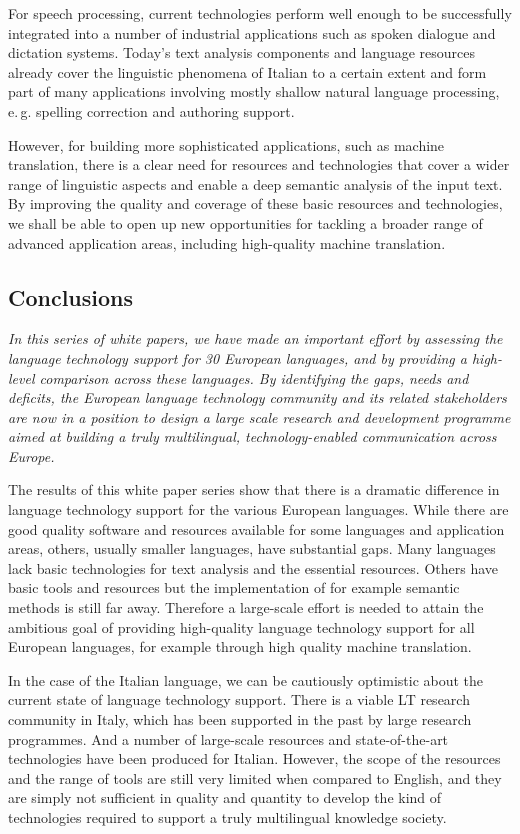 \documentclass[]{../../metanetpaper}
\begin{document}
\begin{multicols}{2}
For speech processing, current technologies perform well enough to be successfully integrated into a number of industrial applications such as spoken dialogue and dictation systems. Today's text analysis components and language resources already cover the linguistic phenomena of Italian to a certain extent and form part of many applications involving mostly shallow natural language processing, e.\,g. spelling correction and authoring support.

However, for building more sophisticated applications, such as machine translation, there is a clear need for resources and technologies that cover a wider range of linguistic aspects and enable a deep semantic analysis of the input text. By improving the quality and coverage of these basic resources and technologies, we shall be able to open up new opportunities for tackling a broader range of advanced application areas, including high-quality machine translation.


\subsection{Conclusions}

\emph{In this series of white papers, we have made an important effort by assessing the language technology support for 30 European languages, and by providing a high-level comparison across these languages. By identifying the gaps, needs and deficits, the European language technology community and its related stakeholders are now in a position to design a large scale research and development programme aimed at building a truly multilingual, technology-enabled communication across Europe.}

The results of this white paper series show that there is a dramatic difference in language technology support for the various European languages. While there are good quality software and resources available for some languages and application areas, others, usually smaller languages, have substantial gaps. Many languages lack basic technologies for text analysis and the essential resources. Others have basic tools and resources but the implementation of for example semantic methods is still far away. Therefore a large-scale effort is needed to attain the ambitious goal of providing high-quality language technology support for all European languages, for example through high quality machine translation. 

In the case of the Italian language, we can be cautiously optimistic about the current state of language technology support. There is a viable LT research community in Italy, which has been supported in the past by large research programmes. And a number of large-scale resources and state-of-the-art technologies have been produced for Italian. However, the scope of the resources and the range of tools are still very limited when compared to English, and they are simply not sufficient in quality and quantity to develop the kind of technologies required to support a truly multilingual knowledge society.


\end{multicols}
\end{document}
